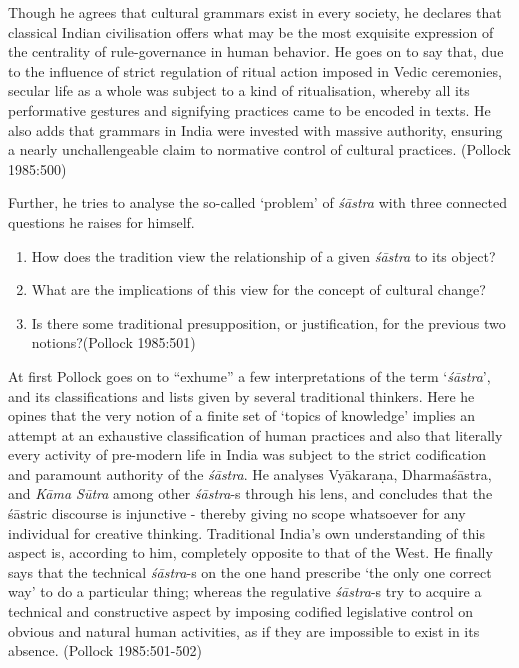 Though he agrees that cultural grammars exist in every society, he declares that classical Indian civilisation offers what may be the most exquisite expression of the centrality of rule-governance in human behavior. He goes on to say that, due to the influence of strict regulation of ritual action imposed in Vedic ceremonies, secular life as a whole was subject to a kind of ritualisation, whereby all its performative gestures and signifying practices came to be encoded in texts. He also adds that grammars in India were invested with massive authority, ensuring a nearly unchallengeable claim to normative control of cultural practices. (Pollock 1985:500)

Further, he tries to analyse the so-called `problem' of {\sl śāstra} with three connected questions he raises for himself.
\begin{enumerate}
\item How does the tradition view the relationship of a given {\sl śāstra} to its object?

\item What are the implications of this view for the concept of cultural change?

\item Is there some traditional presupposition, or justification, for the previous two notions?\hfill (Pollock 1985:501)
\end{enumerate}

At first Pollock goes on to ``exhume'' a few interpretations of the term `{\it śāstra}', and its classifications and lists given by several traditional thinkers. Here he opines that the very notion of a finite set of `topics of knowledge' implies an attempt at an exhaustive classification of human practices and also that literally every activity of pre-modern life in India was subject to the strict codification and paramount authority of the {\it śāstra}. He analyses Vyākaraṇa, Dharmaśāstra, and {\sl Kāma Sūtra} among other {\it śāstra}-s through his lens, and concludes that the śāstric discourse is injunctive - thereby giving no scope whatsoever for any individual for creative thinking. Traditional India's own understanding of this aspect is, according to him, completely opposite to that of the West. He finally says that the technical {\it śāstra}-s on the one hand prescribe `the only one correct way' to do a particular thing;  whereas the regulative {\it śāstra}-s try to acquire a technical and constructive aspect by imposing codified legislative control on obvious and natural human activities, as if they are impossible to exist in its absence. (Pollock 1985:501-502)


